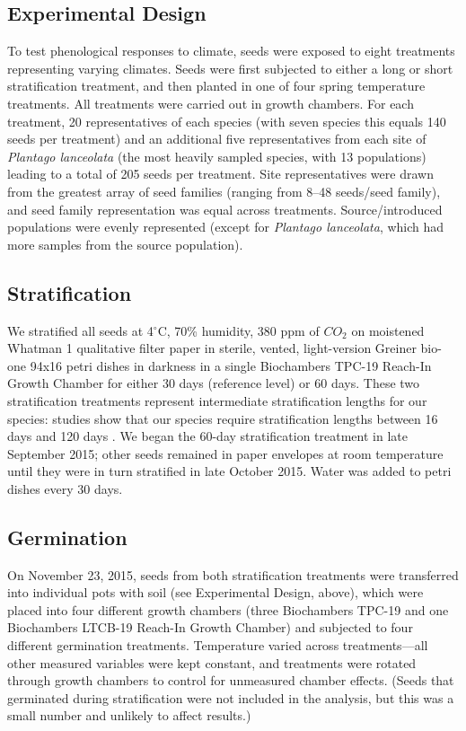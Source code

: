\documentclass[11pt]{article}\usepackage[]{graphicx}\usepackage[]{color}
\begin{document}
	\subsection{Experimental Design} 
	To test phenological responses to climate, seeds were exposed to eight treatments representing varying climates. Seeds were first subjected to either a long or short stratification treatment, and then planted in one of four spring temperature treatments. All treatments were carried out in growth chambers. For each treatment, 20 representatives of each species (with seven species this equals 140 seeds per treatment) and an additional five representatives from each site of \textit{Plantago lanceolata} (the most heavily sampled species, with 13 populations) leading to a total of 205 seeds per treatment. Site representatives were drawn from the greatest array of seed families (ranging from 8--48 seeds/seed family), and seed family representation was equal across treatments. Source/introduced populations were evenly represented (except for \textit{Plantago lanceolata}, which had more samples from the source population).
	
	\subsection{Stratification} 
	We stratified all seeds at 4$^\circ$C, 70\% humidity, 380 ppm of $CO_2$ \parencite[e.g.,][]{Meekins1999,Popay1970} on moistened Whatman 1 qualitative filter paper in sterile, vented, light-version Greiner bio-one 94x16 petri dishes in darkness \parencite{Baskin1998,Popay1970} in a single Biochambers TPC-19 Reach-In Growth Chamber for either 30 days (reference level) or 60 days. These two stratification treatments represent intermediate stratification lengths for our species: studies show that our species require stratification lengths between 16 days \parencite{Popay1970} and 120 days \parencite{Meekins1999}. We began the 60-day stratification treatment in late September 2015; other seeds remained in paper envelopes at room temperature until they were in turn stratified in late October 2015.  Water was added to petri dishes every 30 days.
	
	\subsection{Germination}
	On November 23, 2015, seeds from both stratification treatments were transferred into individual pots with soil (see Experimental Design, above), which were placed into four different growth chambers (three Biochambers TPC-19 and one Biochambers LTCB-19 Reach-In Growth Chamber) and subjected to four different germination treatments. Temperature varied across treatments---all other measured variables were kept constant, and treatments were rotated through growth chambers to control for unmeasured chamber effects. (Seeds that germinated during stratification were not included in the analysis, but this was a small number and unlikely to affect results.)
	
\end{document}
